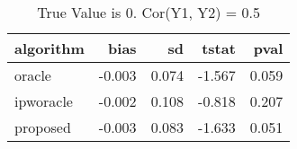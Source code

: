 \begin{table}[h!]

\caption{True Value is 0. Cor(Y1, Y2) = 0.5}
\centering
\begin{tabular}[t]{lrrrr}
\toprule
algorithm & bias & sd & tstat & pval\\
\midrule
oracle & -0.003 & 0.074 & -1.567 & 0.059\\
ipworacle & -0.002 & 0.108 & -0.818 & 0.207\\
proposed & -0.003 & 0.083 & -1.633 & 0.051\\
\bottomrule
\end{tabular}
\end{table}
